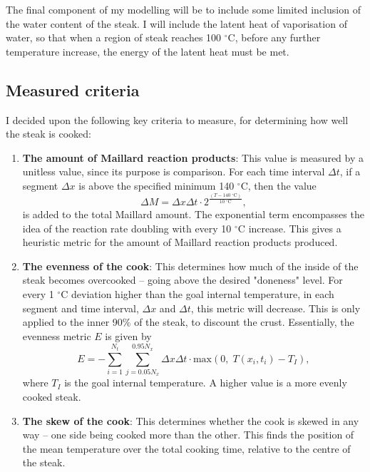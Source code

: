 \documentclass[11pt]{article}
\begin{document}
	The final component of my modelling will be to include some limited inclusion of the water content of the steak. I will include the latent heat of vaporisation of water, so that when a region of steak reaches 100 $^\circ\text{C}$, before any further temperature increase, the energy of the latent heat must be met.
	
	\subsection{Measured criteria}
	
	I decided upon the following key criteria to measure, for determining how well the steak is cooked:
	\begin{enumerate}
		\item \textbf{The amount of Maillard reaction products}: This value is measured by a unitless value, since its purpose is comparison. For each time interval $\Delta t$, if a segment $\Delta x$ is above the specified minimum 140 $^\circ \text{C}$, then the value
		\begin{equation}
			\Delta M = \Delta x \Delta t \cdot 2^{\frac{\left(T - 140\;^\circ \text{C}\right)}{10\;^\circ\text{C}}},
		\end{equation}
		is added to the total Maillard amount. The exponential term encompasses the idea of the reaction rate doubling with every 10 $^\circ \text{C}$ increase. This gives a heuristic metric for the amount of Maillard reaction products produced.
		
		\item \textbf{The evenness of the cook}: This determines how much of the inside of the steak becomes overcooked -- going above the desired "doneness" level. For every 1 $^\circ \text{C}$ deviation higher than the goal internal temperature, in each segment and time interval, $\Delta x$ and $\Delta t$, this metric will decrease. This is only applied to the inner 90\% of the steak, to discount the crust. Essentially, the evenness metric $E$ is given by
		\begin{equation}
			E = -\sum_{i=1}^{N_t} \sum_{j=0.05N_x}^{0.95N_x} \Delta x \Delta t \cdot \text{max}\left(0,\; T(x_i, t_i) - T_I\right),
		\end{equation}
		where $T_I$ is the goal internal temperature. A higher value is a more evenly cooked steak. 
		
		\item \textbf{The skew of the cook}: This determines whether the cook is skewed in any way -- one side being cooked more than the other. This finds the position of the mean temperature over the total cooking time, relative to the centre of the steak.
	\end{enumerate}
	
\end{document}
